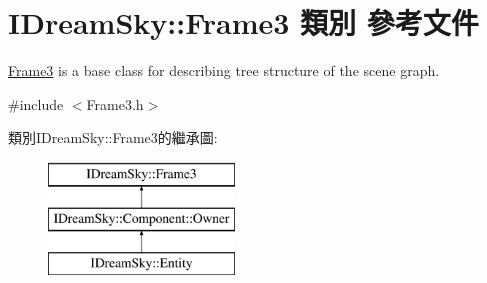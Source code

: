 \hypertarget{class_i_dream_sky_1_1_frame3}{}\section{I\+Dream\+Sky\+:\+:Frame3 類別 參考文件}
\label{class_i_dream_sky_1_1_frame3}


\hyperlink{class_i_dream_sky_1_1_frame3}{Frame3} is a base class for describing tree structure of the scene graph.  




{\ttfamily \#include $<$Frame3.\+h$>$}

類別\+I\+Dream\+Sky\+:\+:Frame3的繼承圖\+:\begin{figure}[H]
\begin{center}
\leavevmode
\includegraphics[height=3.000000cm]{class_i_dream_sky_1_1_frame3}
\end{center}
\end{figure}
